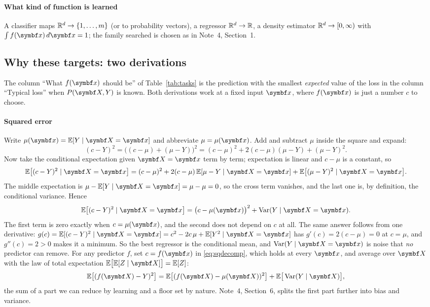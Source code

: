 \documentclass[11pt]{article}
\begin{document}
\paragraph{What kind of function is learned} A classifier maps $\mathbb{R}^d \to \{1, \dots, m\}$ (or to probability
vectors), a regressor $\mathbb{R}^d \to \mathbb{R}$, a density estimator $\mathbb{R}^d \to [0, \infty)$ with $\int f(\x)\,d\x = 1$; the family
searched is chosen as in Note~4, Section~1.

\subsection{Why these targets: two derivations}\label{sec:targets}

The column ``What $f(\x)$ should be'' of Table~\ref{tab:tasks} is the prediction with the smallest \emph{expected}
value of the loss in the column ``Typical loss'' when $P(\X, Y)$ is known. Both derivations work at a fixed input $\x$, where $f(\x)$ is just a number $c$ to choose.

\paragraph{Squared error} Write $\mu(\x) = \E[Y \mid \X = \x]$ and abbreviate $\mu = \mu(\x)$. Add and subtract $\mu$
inside the square and expand:
\[
  (c - Y)^2 = \big((c - \mu) + (\mu - Y)\big)^2 = (c - \mu)^2 + 2(c - \mu)(\mu - Y) + (\mu - Y)^2 .
\]
Now take the conditional expectation given $\X = \x$ term by term; expectation is linear and $c - \mu$ is a
constant, so
\[
  \E\big[(c - Y)^2 \mid \X = \x\big] = (c - \mu)^2 + 2(c - \mu)\,\E[\mu - Y \mid \X = \x] + \E\big[(\mu - Y)^2 \mid \X = \x\big].
\]
The middle expectation is $\mu - \E[Y \mid \X = \x] = \mu - \mu = 0$, so the cross term vanishes, and the last one is,
by definition, the conditional variance. Hence
\begin{equation}\label{eq:sqdecomp}
  \E\big[(c - Y)^2 \mid \X = \x\big] = \big(c - \mu(\x)\big)^2 + \Var(Y \mid \X = \x).
\end{equation}
The first term is zero exactly when $c = \mu(\x)$, and the second does not depend on $c$ at all. The same answer
follows from one derivative: $g(c) = \E[(c - Y)^2 \mid \X = \x] = c^2 - 2c\,\mu + \E[Y^2 \mid \X = \x]$ has
$g'(c) = 2(c - \mu) = 0$ at $c = \mu$, and $g''(c) = 2 > 0$ makes it a minimum. So the best regressor is the
conditional mean, and $\Var(Y \mid \X = \x)$ is noise that \emph{no} predictor can remove. For any predictor $f$,
set $c = f(\x)$ in \eqref{eq:sqdecomp}, which holds at every $\x$, and average over $\X$ with the law of total
expectation $\E\big[\E[Z \mid \X]\big] = \E[Z]$:
\begin{equation}\label{eq:sqdecompavg}
  \E\big[(f(\X) - Y)^2\big] = \E\big[(f(\X) - \mu(\X))^2\big] + \E\big[\Var(Y \mid \X)\big] ,
\end{equation}
the sum of a part we can reduce by learning and a floor set by nature. Note~4, Section~6, splits the first part
further into bias and variance.
\end{document}
